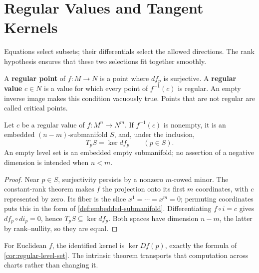 \section{Regular Values and Tangent Kernels}
\label{sec:manifold-regular-values}
Equations select subsets; their differentials select the allowed directions.
The rank hypothesis ensures that these two selections fit together smoothly.
\begin{definition}
A \textbf{regular point} of $f:M\to N$ is a point where $df_p$ is
surjective. A \textbf{regular value} $c\in N$ is a value for which every
point of $f^{-1}(c)$ is regular. An empty inverse image makes this condition
vacuously true. Points that are not regular are called critical points.
\end{definition}
\begin{theorem}\label{thm:manifold-regular-level}
Let $c$ be a regular value of $f:M^n\to N^m$. If $f^{-1}(c)$ is nonempty,
it is an embedded $(n-m)$-submanifold $S$, and, under the inclusion,
\[
\boxed{T_pS=\ker df_p\qquad(p\in S).}
\]
An empty level set is an embedded empty submanifold; no assertion of a
negative dimension is intended when $n<m$.
\end{theorem}
\begin{proof}
Near $p\in S$, surjectivity persists by a nonzero $m$-rowed minor.
The constant-rank theorem makes $f$ the projection onto its first $m$
coordinates, with $c$ represented by zero. Its fiber is the slice
$x^1=\cdots=x^m=0$; permuting coordinates puts this in the form of
\cref{def:embedded-submanifold}. Differentiating $f\circ i=c$ gives
$df_p\circ di_p=0$, hence $T_pS\subseteq\ker df_p$. Both spaces have
dimension $n-m$, the latter by rank--nullity, so they are equal.
\end{proof}
For Euclidean $f$, the identified kernel is $\ker Df(p)$, exactly the
formula of \cref{cor:regular-level-set}. The intrinsic theorem transports
that computation across charts rather than changing it.

